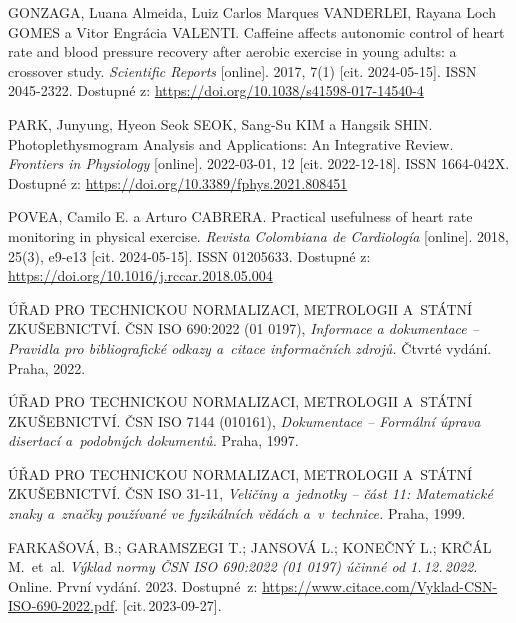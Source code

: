 \begin{thebibliography}{99}
		GONZAGA, Luana Almeida, Luiz Carlos Marques VANDERLEI, Rayana Loch GOMES a Vitor Engrácia VALENTI.
		Caffeine affects autonomic control of heart rate and blood pressure recovery after aerobic exercise in young adults: a crossover study.
		\emph{Scientific Reports} [online].
		2017, 7(1) [cit. 2024-05-15].
		ISSN 2045-2322.
		Dostupné z: \url{https://doi.org/10.1038/s41598-017-14540-4}

		PARK, Junyung, Hyeon Seok SEOK, Sang-Su KIM a Hangsik SHIN.
		Photoplethysmogram Analysis and Applications: An Integrative Review.
		\emph{Frontiers in Physiology} [online].
		2022-03-01, 12 [cit. 2022-12-18].
		ISSN 1664-042X.
		Dostupné z: \url{https://doi.org/10.3389/fphys.2021.808451}

		POVEA, Camilo E. a Arturo CABRERA.
		Practical usefulness of heart rate monitoring in physical exercise.
		\emph{Revista Colombiana de Cardiología} [online].
		2018, 25(3), e9-e13 [cit. 2024-05-15].
		ISSN 01205633.
		Dostupné z: \url{https://doi.org/10.1016/j.rccar.2018.05.004}


		ÚŘAD PRO TECHNICKOU NORMALIZACI, METROLOGII A~STÁTNÍ ZKUŠEBNICTVÍ.
		ČSN ISO 690:2022 (01 0197), \emph{Informace a dokumentace -- Pravidla pro bibliografické odkazy a~citace informačních zdrojů.}
		Čtvrté vydání. Praha, 2022.

		ÚŘAD PRO TECHNICKOU NORMALIZACI, METROLOGII A~STÁTNÍ ZKUŠEBNICTVÍ.
		ČSN ISO 7144 (010161), \emph{Dokumentace -- Formální úprava disertací a~podobných dokumentů.}
		Praha, 1997.

		ÚŘAD PRO TECHNICKOU NORMALIZACI, METROLOGII A~STÁTNÍ ZKUŠEBNICTVÍ.
		ČSN ISO 31-11, \emph{Veličiny a~jednotky -- část 11: Matematické znaky a~značky používané ve fyzikálních vědách a~v~technice.}
		Praha, 1999.

		FARKAŠOVÁ, B.; GARAMSZEGI T.; JANSOVÁ L.; KONEČNÝ L.; KRČÁL M.\ et~al.
		\emph{Výklad normy ČSN ISO 690:2022 (01 0197) účinné od 1.\,12.\,2022}.
		Online. První vydání. 2023.
		Dostupné~z:
		\url{https://www.citace.com/Vyklad-CSN-ISO-690-2022.pdf}.
		[cit.\,2023-09-27].

\end{thebibliography}


